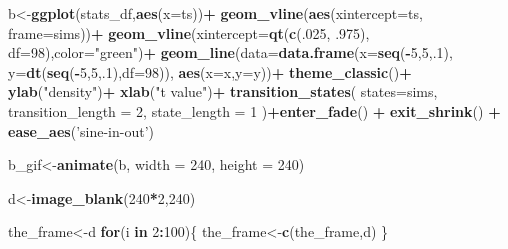 \documentclass[]{book}
\newenvironment{Shaded}{\begin{snugshade}}{\end{snugshade}}
\newcommand{\ControlFlowTok}[1]{\textcolor[rgb]{0.13,0.29,0.53}{\textbf{#1}}}
\newcommand{\DataTypeTok}[1]{\textcolor[rgb]{0.13,0.29,0.53}{#1}}
\newcommand{\DecValTok}[1]{\textcolor[rgb]{0.00,0.00,0.81}{#1}}
\newcommand{\FloatTok}[1]{\textcolor[rgb]{0.00,0.00,0.81}{#1}}
\newcommand{\KeywordTok}[1]{\textcolor[rgb]{0.13,0.29,0.53}{\textbf{#1}}}
\newcommand{\NormalTok}[1]{#1}
\newcommand{\OperatorTok}[1]{\textcolor[rgb]{0.81,0.36,0.00}{\textbf{#1}}}
\newcommand{\StringTok}[1]{\textcolor[rgb]{0.31,0.60,0.02}{#1}}
\begin{document}
\begin{Shaded}
\begin{Highlighting}[]
{{{{{{{{\NormalTok{b<-}\KeywordTok{ggplot}\NormalTok{(stats_df,}\KeywordTok{aes}\NormalTok{(}\DataTypeTok{x=}\NormalTok{ts))}\OperatorTok{+}
\StringTok{  }\KeywordTok{geom_vline}\NormalTok{(}\KeywordTok{aes}\NormalTok{(}\DataTypeTok{xintercept=}\NormalTok{ts, }\DataTypeTok{frame=}\NormalTok{sims))}\OperatorTok{+}
\StringTok{  }\KeywordTok{geom_vline}\NormalTok{(}\DataTypeTok{xintercept=}\KeywordTok{qt}\NormalTok{(}\KeywordTok{c}\NormalTok{(.}\DecValTok{025}\NormalTok{, }\FloatTok{.975}\NormalTok{), }\DataTypeTok{df=}\DecValTok{98}\NormalTok{),}\DataTypeTok{color=}\StringTok{"green"}\NormalTok{)}\OperatorTok{+}
\StringTok{  }\KeywordTok{geom_line}\NormalTok{(}\DataTypeTok{data=}\KeywordTok{data.frame}\NormalTok{(}\DataTypeTok{x=}\KeywordTok{seq}\NormalTok{(}\OperatorTok{-}\DecValTok{5}\NormalTok{,}\DecValTok{5}\NormalTok{,.}\DecValTok{1}\NormalTok{),}
                            \DataTypeTok{y=}\KeywordTok{dt}\NormalTok{(}\KeywordTok{seq}\NormalTok{(}\OperatorTok{-}\DecValTok{5}\NormalTok{,}\DecValTok{5}\NormalTok{,.}\DecValTok{1}\NormalTok{),}\DataTypeTok{df=}\DecValTok{98}\NormalTok{)),}
            \KeywordTok{aes}\NormalTok{(}\DataTypeTok{x=}\NormalTok{x,}\DataTypeTok{y=}\NormalTok{y))}\OperatorTok{+}
\StringTok{  }\KeywordTok{theme_classic}\NormalTok{()}\OperatorTok{+}
\StringTok{  }\KeywordTok{ylab}\NormalTok{(}\StringTok{"density"}\NormalTok{)}\OperatorTok{+}
\StringTok{  }\KeywordTok{xlab}\NormalTok{(}\StringTok{"t value"}\NormalTok{)}\OperatorTok{+}
\StringTok{  }\KeywordTok{transition_states}\NormalTok{(}
    \DataTypeTok{states=}\NormalTok{sims,}
    \DataTypeTok{transition_length =} \DecValTok{2}\NormalTok{,}
    \DataTypeTok{state_length =} \DecValTok{1}
\NormalTok{  )}\OperatorTok{+}\KeywordTok{enter_fade}\NormalTok{() }\OperatorTok{+}\StringTok{ }
\StringTok{  }\KeywordTok{exit_shrink}\NormalTok{() }\OperatorTok{+}
\StringTok{  }\KeywordTok{ease_aes}\NormalTok{(}\StringTok{'sine-in-out'}\NormalTok{)}

\NormalTok{b_gif<-}\KeywordTok{animate}\NormalTok{(b, }\DataTypeTok{width =} \DecValTok{240}\NormalTok{, }\DataTypeTok{height =} \DecValTok{240}\NormalTok{)}


\NormalTok{d<-}\KeywordTok{image_blank}\NormalTok{(}\DecValTok{240}\OperatorTok{*}\DecValTok{2}\NormalTok{,}\DecValTok{240}\NormalTok{)}

\NormalTok{the_frame<-d}
\ControlFlowTok{for}\NormalTok{(i }\ControlFlowTok{in} \DecValTok{2}\OperatorTok{:}\DecValTok{100}\NormalTok{)\{}
\NormalTok{  the_frame<-}\KeywordTok{c}\NormalTok{(the_frame,d)}
\NormalTok{\}}

}}}}}}}}
\end{Highlighting}
\end{Shaded}
\end{document}
